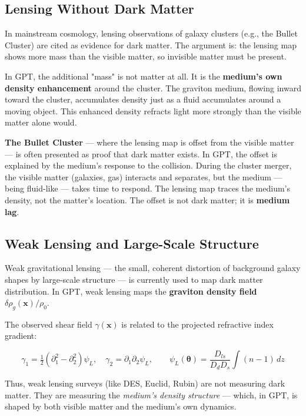 \documentclass[12pt, a4paper]{article}
\begin{document}
\subsection{Lensing Without Dark Matter}
\label{subsec:lensing_no_dark_matter}

In mainstream cosmology, lensing observations of galaxy clusters (e.g., the Bullet Cluster) are cited as evidence for dark matter. The argument is: the lensing map shows more mass than the visible matter, so invisible matter must be present.

In GPT, the additional "mass" is not matter at all. It is the \textbf{medium's own density enhancement} around the cluster. The graviton medium, flowing inward toward the cluster, accumulates density just as a fluid accumulates around a moving object. This enhanced density refracts light more strongly than the visible matter alone would.

\textbf{The Bullet Cluster} — where the lensing map is offset from the visible matter — is often presented as proof that dark matter exists. In GPT, the offset is explained by the medium's response to the collision. During the cluster merger, the visible matter (galaxies, gas) interacts and separates, but the medium — being fluid-like — takes time to respond. The lensing map traces the medium's density, not the matter's location. The offset is not dark matter; it is \textbf{medium lag}.

\subsection{Weak Lensing and Large-Scale Structure}
\label{subsec:weak_lensing}

Weak gravitational lensing — the small, coherent distortion of background galaxy shapes by large-scale structure — is currently used to map dark matter distribution. In GPT, weak lensing maps the \textbf{graviton density field} \( \delta \rho_g(\mathbf{x}) / \rho_0 \).

The observed shear field \( \gamma(\mathbf{x}) \) is related to the projected refractive index gradient:

\[
\gamma_1 = \tfrac{1}{2}\left(\partial_1^2 - \partial_2^2\right)\psi_L, \quad \gamma_2 = \partial_1 \partial_2 \psi_L, \qquad \psi_L(\boldsymbol{\theta}) = \frac{D_{ls}}{D_d D_s} \int (n - 1)\, dz
\]

Thus, weak lensing surveys (like DES, Euclid, Rubin) are not measuring dark matter. They are measuring the \textit{medium's density structure} — which, in GPT, is shaped by both visible matter and the medium's own dynamics.
\end{document}
